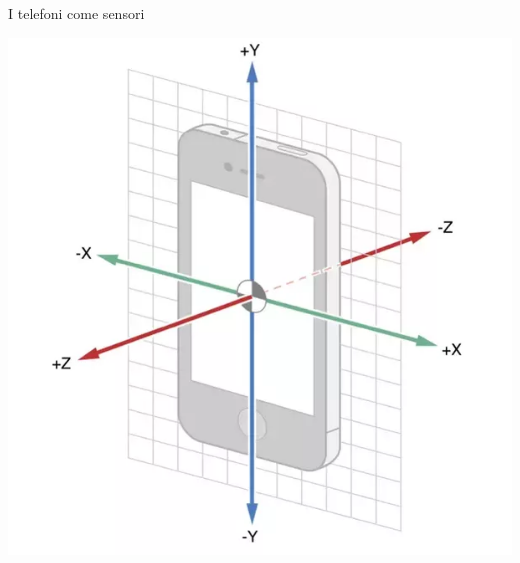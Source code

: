 \begin{frame}[c]{I telefoni come sensori}
\begin{center}
\includegraphics[scale=0.3]{introduzione/smartphone_axes}

\end{center}
\end{frame}
